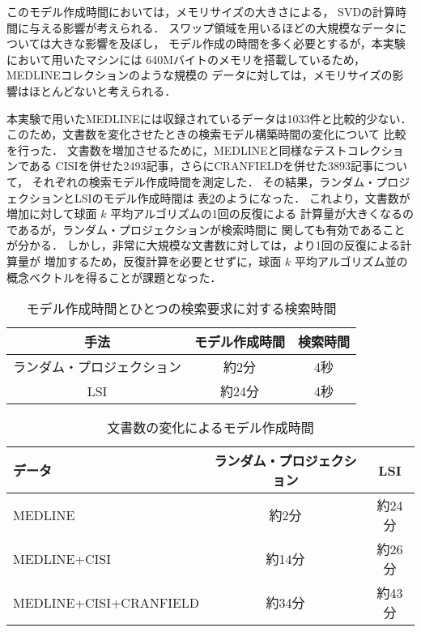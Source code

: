 このモデル作成時間においては，メモリサイズの大きさによる，
SVDの計算時間に与える影響が考えられる．
スワップ領域を用いるほどの大規模なデータについては大きな影響を及ぼし，
モデル作成の時間を多く必要とするが，本実験において用いたマシンには
640Mバイトのメモリを搭載しているため，MEDLINEコレクションのような規模の
データに対しては，メモリサイズの影響はほとんどないと考えられる．

本実験で用いたMEDLINEには収録されているデータは1033件と比較的少ない．
このため，文書数を変化させたときの検索モデル構築時間の変化について
比較を行った．
文書数を増加させるために，MEDLINEと同様なテストコレクションである
CISIを併せた2493記事，さらにCRANFIELDを併せた3893記事について，
それぞれの検索モデル作成時間を測定した．
その結果，ランダム・プロジェクションとLSIのモデル作成時間は
表\ref{model_time}のようになった．
これより，文書数が増加に対して球面 $k$ 平均アルゴリズムの1回の反復による
計算量が大きくなるのであるが，ランダム・プロジェクションが検索時間に
関しても有効であることが分かる．
しかし，非常に大規模な文書数に対しては，より1回の反復による計算量が
増加するため，反復計算を必要とせずに，球面 $k$ 平均アルゴリズム並の
概念ベクトルを得ることが課題となった．
\begin{table} \caption{モデル作成時間とひとつの検索要求に対する検索時間} 
\renewcommand{\arraystretch}{}
\label{time}
\centering
\begin{tabular}{c|c|c} \hline \hline
手法 & モデル作成時間 & 検索時間 \\ \hline
ランダム・プロジェクション & 約2分 & 4秒\\
LSI & 約24分 & 4秒\\ \hline
\end{tabular}
\end{table}
\begin{table} \caption{文書数の変化によるモデル作成時間} 
\renewcommand{\arraystretch}{}
\label{model_time}
\centering
\begin{tabular}{l|c|c} \hline \hline
データ                 & ランダム・プロジェクション & LSI \\ \hline
MEDLINE                & 約2分                      & 約24分 \\
MEDLINE+CISI           & 約14分                     & 約26分 \\
MEDLINE+CISI+CRANFIELD & 約34分                     & 約43分 \\ \hline
\end{tabular}
\end{table}

